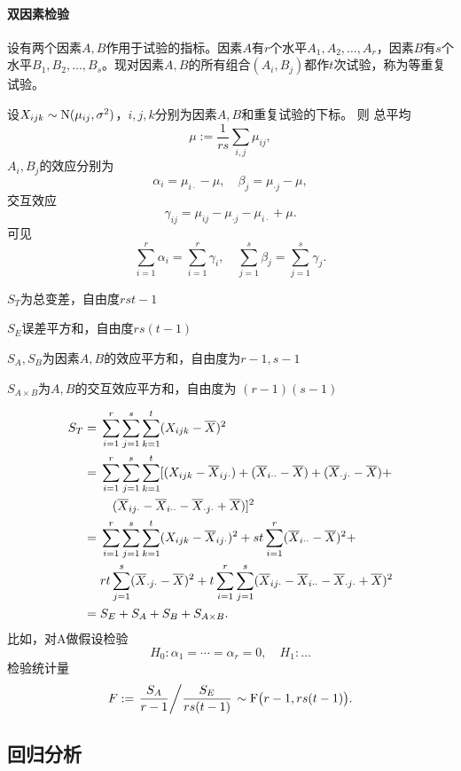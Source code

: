 \paragraph{双因素检验}
设有两个因素$A,B$作用于试验的指标。因素$ A $有$ r $个水平$ A_1, A_2,\ldots, A_r$，因素$ B $有$ s $个水平$ B_1, B_2,\ldots, B_s $。现对因素$ A, B $的所有组合$(A_i, B_j)$都作$t$次试验，称为等重复试验。

设$X_{ijk}\sim\operatorname{N}(\mu_{ij},\sigma^2)$，$i, j, k $分别为因素$ A, B $和重复试验的下标。
则
总平均
\[
	\mu:=\frac1{rs}\sum_{i,j}\mu_{ij},
\]
$A_i,B_j$的效应分别为
\[
	\alpha_i=\mu_{i\cdot}-\mu,\quad\beta_j=\mu_{\cdot j}-\mu,
\]
交互效应
\[
	\gamma_{ij}=\mu_{ij}-\mu_{\cdot j}-\mu_{i\cdot}+\mu.
\]
可见
\[
	\sum_{i=1}^r\alpha_i=\sum_{i=1}^r\gamma_i,\quad\sum_{j=1}^s\beta_j=\sum_{j=1}^s\gamma_j.
\]
\begin{compactitem}
	\item $S_T$为总变差，自由度$rst-1$
	\item $S_E$误差平方和，自由度$rs(t-1)$
	\item $S_A,S_B$为因素$ A, B $的效应平方和，自由度为$ r - 1, s - 1$
	\item $S_{A\times B}$为$A,B$的交互效应平方和，自由度为 $(r - 1)(s - 1)$
\end{compactitem}
\begin{align}\notag
	S_T={}& \sum_{i=1}^r \sum_{j=1}^s \sum_{k=1}^t(X_{i j k}-\overline{X})^2 \\\notag
	={}& \sum_{i=1}^r \sum_{j=1}^s \sum_{k=1}^t[(X_{i j k}-\overline{X}_{i j \cdot})+(\overline{X}_{i\cdot\cdot}-\overline{X})+(\overline{X}_{\cdot j \cdot}-\overline{X})+\\\notag
	&\quad(\overline{X}_{i j \cdot}-\overline{X}_{i \cdot\cdot}-\overline{X}_{\cdot j \cdot}+\overline{X})]^2 \\\notag
	={}& \sum_{i=1}^r \sum_{j=1}^s \sum_{k=1}^t(X_{i j k}-\overline{X}_{i j \cdot})^2+s t \sum_{i=1}^r(\overline{X}_{i\cdot\cdot}-\overline{X})^2+ \\\notag
	& r t \sum_{j=1}^s(\overline{X}_{\cdot j \cdot}-\overline{X})^2+t \sum_{i=1}^r \sum_{j=1}^s(\overline{X}_{i j \cdot}-\overline{X}_{i\cdot\cdot}-\overline{X}_{\cdot j \cdot}+\overline{X})^2\\
	={}&S_E+S_A+S_B+S_{A\times B}.
\end{align}
比如，对A做假设检验
\[
	H_0:\alpha_1=\cdots=\alpha_r=0,\quad H_1:\ldots
\]
检验统计量 
\[
	F:=\left.\frac{S_A}{r-1}\middle\slash \frac{S_E}{rs(t-1)}\right.\sim\mathrm F\bigl(r-1,rs(t-1)\bigr).
\]

\subsection{回归分析}

